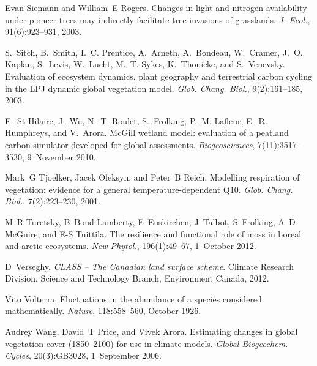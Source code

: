 \begin{DoxyDescription}
\item[\label{_CITEREF_Siemann2003-jl}%
\mbox{[}54\mbox{]}]Evan Siemann and William~E Rogers. Changes in light and nitrogen availability under pioneer trees may indirectly facilitate tree invasions of grasslands. {\itshape J. Ecol.}, 91(6)\+:923--931, 2003. 


\item[\label{_CITEREF_Sitch2003-847}%
\mbox{[}55\mbox{]}]S.~Sitch, B.~Smith, I.~C. Prentice, A.~Arneth, A.~Bondeau, W.~Cramer, J.~O. Kaplan, S.~Levis, W.~Lucht, M.~T. Sykes, K.~Thonicke, and S.~Venevsky. Evaluation of ecosystem dynamics, plant geography and terrestrial carbon cycling in the L\+P\+J dynamic global vegetation model. {\itshape Glob. Chang. Biol.}, 9(2)\+:161--185, 2003. 


\item[\label{_CITEREF_St-Hilaire2010-5e9}%
\mbox{[}56\mbox{]}]F.~St-\/\+Hilaire, J.~Wu, N.~T. Roulet, S.~Frolking, P.~M. Lafleur, E.~R. Humphreys, and V.~Arora. Mc\+Gill wetland model\+: evaluation of a peatland carbon simulator developed for global assessments. {\itshape Biogeosciences}, 7(11)\+:3517--3530, 9~November 2010. 


\item[\label{_CITEREF_Tjoelker2001-uz}%
\mbox{[}57\mbox{]}]Mark~G Tjoelker, Jacek Oleksyn, and Peter~B Reich. Modelling respiration of vegetation\+: evidence for a general temperature-\/dependent Q10. {\itshape Glob. Chang. Biol.}, 7(2)\+:223--230, 2001.


\item[\label{_CITEREF_Turetsky2012-qh}%
\mbox{[}58\mbox{]}]M~R Turetsky, B~Bond-\/\+Lamberty, E~Euskirchen, J~Talbot, S~Frolking, A~D Mc\+Guire, and E-\/\+S Tuittila. The resilience and functional role of moss in boreal and arctic ecosystems. {\itshape New Phytol.}, 196(1)\+:49--67, 1~October 2012. 


\item[\label{_CITEREF_Verseghy2012-c0e}%
\mbox{[}59\mbox{]}]D~Verseghy. {\itshape C\+L\+A\+S\+S -- The Canadian land surface scheme}. Climate Research Division, Science and Technology Branch, Environment Canada, 2012.


\item[\label{_CITEREF_Volterra1926-iz}%
\mbox{[}60\mbox{]}]Vito Volterra. Fluctuations in the abundance of a species considered mathematically. {\itshape Nature}, 118\+:558--560, October 1926. 


\item[\label{_CITEREF_Wang2006-he}%
\mbox{[}61\mbox{]}]Audrey Wang, David~T Price, and Vivek Arora. Estimating changes in global vegetation cover (1850–2100) for use in climate models. {\itshape Global Biogeochem. Cycles}, 20(3)\+:G\+B3028, 1~September 2006. 



\end{DoxyDescription}
